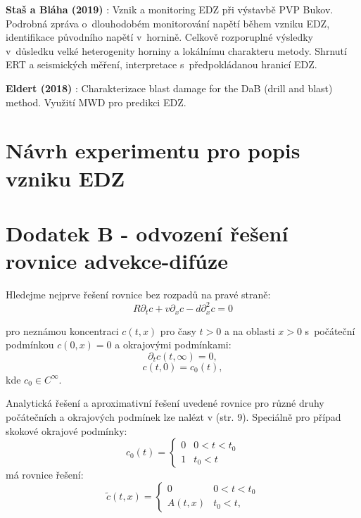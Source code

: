 \documentclass{article}
\def\prtl{\partial}
\begin{document}
{\bf Staš a Bláha (2019)} \cite{SURAO_351/2019}: Vznik a monitoring EDZ při výstavbě PVP Bukov.
Podrobná zpráva o~dlouhodobém monitorování napětí během vzniku EDZ, identifikace původního napětí v~hornině. Celkově rozporuplné výsledky v~důsledku velké heterogenity horniny a lokálnímu charakteru metody. Shrnutí ERT a seismických měření, interpretace s~předpokládanou hranicí EDZ.  

{\bf Eldert (2018)} \cite{JeroenvanEldert2018}: Charakterizace blast damage for the DaB (drill and blast) method. Využití MWD pro predikci EDZ.

\section{Návrh experimentu pro popis vzniku EDZ}

\label{sec:experiment}



\pagebreak






\section*{Dodatek B - odvození řešení rovnice advekce-difúze}
Hledejme nejprve řešení rovnice bez rozpadů na pravé straně:
\begin{equation}
    \label{eq:no_decay_ad}
    R\prtl_t c + v \prtl_x c - d \prtl^2_x c = 0
\end{equation}

pro neznámou koncentraci $c(t, x)$ pro časy $t>0$ a na oblasti $x>0$ s~počáteční podmínkou $c(0, x) = 0$ a
okrajovými podmínkami:
\[
    \prtl_t c(t, \infty) = 0,
\]
\[
    c(t, 0) = c_0(t),
\]
kde $c_0 \in C^\infty$.

Analytická řešení a aproximativní řešení uvedené rovnice pro různé druhy počátečních
a okrajových podmínek lze nalézt v \cite{Genuchten1982} (str. 9). 
Speciálně pro případ skokové okrajové podmínky:
\begin{equation}
    \label{eq:jump_bc}
    c_0(t) = \left\{\begin{array}{ll}
         0 & 0 < t < t_0 \\
         1   & t_0 < t
    \end{array}\right. 
\end{equation}
má rovnice řešení:
\begin{equation}
    \label{eq:jump_sol}
    \tilde c(t, x) = 
    \left\{\begin{array}{ll}
         0                     & 0 < t < t_0 \\
         A(t,x)   & t_0 < t,
    \end{array}\right. 
\end{equation}
\end{document}
